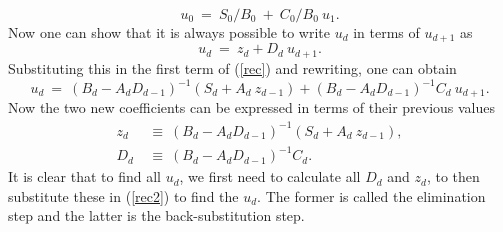 \documentclass[]{article}
\begin{document}
\begin{equation}
u_{0} \ = \ S_{0} / B_{0} \ + \ C_{0}/B_{0} \ u_{1} .
\label{init}
\end{equation}
Now one can show that it is always possible to write $u_{d}$ in terms of $u_{d+1}$ as
\begin{equation}
u_{d} \ = \ z_{d} + D_{d} \ u_{d+1}  .
\end{equation}
Substituting this in the first term of (\ref{rec}) and rewriting, one can obtain
\begin{equation}
u_{d} \ = \ \left( B_{d} - A_{d} D_{d-1} \right)^{-1} \left( S_{d} + A_{d} \ z_{d-1} \right)   + \left( B_{d} - A_{d} D_{d-1} \right)^{-1} C_{d}  \ u_{d+1}  .
\label{rec2}
\end{equation}
Now the two new coefficients can be expressed in terms of their previous values
\begin{equation}
\begin{split}
z_{d} \ &\equiv \ \left( B_{d} - A_{d} D_{d-1} \right)^{-1} \left( S_{d} + A_{d} \ z_{d-1} \right), \\
D_{d} \ &\equiv \ \left( B_{d} - A_{d} D_{d-1} \right)^{-1} C_{d} .
\end{split}
\label{elim}
\end{equation}
It is clear that to find all $u_{d}$, we first need to calculate all $D_{d}$ and $z_{d}$, to then substitute these in (\ref{rec2}) to find the $u_{d}$. The former is called the elimination step and the latter is the back-substitution step.

\bigskip
\end{document}
